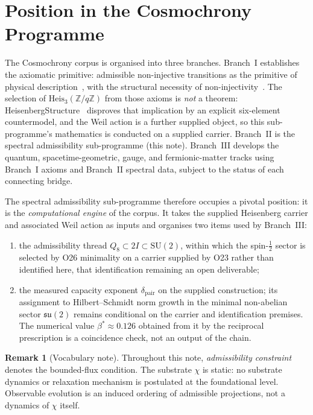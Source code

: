 \documentclass[11pt,a4paper]{article}
\theoremstyle{definition}
\newtheorem{remark}{Remark}
\newcommand{\Heis}{\mathrm{Heis}}
\newcommand{\SU}{\mathrm{SU}}
\newcommand{\su}{\mathfrak{su}}
\newcommand{\dimpair}{\delta_{\mathrm{pair}}}
\newcommand{\betastar}{\beta^*}
\begin{document}
  \section{Position in the Cosmochrony Programme}
    \label{sec:position}

    The Cosmochrony corpus is organised into three branches.
    Branch~I establishes the axiomatic primitive: admissible non-injective transitions as the
    primitive of physical description~\cite{Beau2026m}, with the structural necessity of
    non-injectivity~\cite{Beau2026l}.
    The selection of $\Heis_3(\mathbb{Z}/q\mathbb{Z})$ from those axioms is \emph{not} a
    theorem: HeisenbergStructure~\cite{Beau2026HeisenbergStructure} disproves that implication by
    an explicit six-element countermodel, and the Weil action is a further supplied object, so this
    sub-programme's mathematics is conducted on a supplied carrier.
    Branch~II is the spectral admissibility sub-programme (this note).
    Branch~III develops the quantum, spacetime-geometric, gauge, and fermionic-matter tracks using
    Branch~I axioms and Branch~II spectral data, subject to the status of each connecting bridge.

    \medskip
    The spectral admissibility sub-programme therefore occupies a pivotal position: it is
    the \emph{computational engine} of the corpus.
    It takes the supplied Heisenberg carrier and associated Weil action as inputs and organises two
    items used by Branch~III:
    \begin{enumerate}
      \item the admissibility thread $Q_8 \subset 2I \subset \SU(2)$, within which the
      spin-$\tfrac{1}{2}$ sector is selected by O26 minimality on a carrier supplied by O23 rather
      than identified here, that identification remaining an open deliverable;
      \item the measured capacity exponent $\dimpair$ on the supplied construction; its assignment
      to Hilbert--Schmidt norm growth in the minimal non-abelian sector $\su(2)$ remains conditional
      on the carrier and identification premises.
      The numerical value $\betastar \approx 0.126$ obtained from it by the reciprocal
      prescription is a coincidence check, not an output of the chain.
    \end{enumerate}

    \begin{remark}[Vocabulary note]
Throughout this note, \emph{admissibility constraint} denotes the bounded-flux condition.
The substrate $\chi$ is static: no substrate dynamics or relaxation mechanism is postulated
at the foundational level.
Observable evolution is an induced ordering of admissible projections, not a dynamics of
$\chi$ itself.
    \end{remark}
\end{document}
